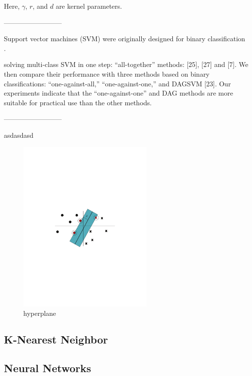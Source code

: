 Here, $\gamma$, $r$, and $d$ are kernel parameters.

--------------------------

Support vector machines (SVM) were originally designed for binary classification \cite{hsu2002comparison}.

solving multi-class SVM in one step: “all-together” methods: [25], [27] and [7]. We then compare their performance with three methods based on binary classifications: “one-against-all,” “one-against-one,” and DAGSVM [23]. Our experiments indicate that the “one-against-one” and DAG methods are more suitable for practical use than the other methods. 

--------------------------

asdasdasd \cite{berwick2003idiot}

\begin{figure}[!htp]
  \center
  \includegraphics[width=0.6\textwidth]{figures/hyperplane}
  \caption{hyperplane}
  \label{fig:hyperplane}
\end{figure}

\subsection{K-Nearest Neighbor}

\subsection{Neural Networks}

\fi